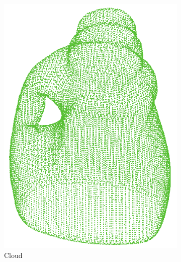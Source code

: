 \begin{figure}[!t]
\begin{subfigure}{0.3\linewidth}
    \includegraphics[width=\linewidth]{Figures/ObjRecog/cloud.png}
    \caption{Cloud}
    \label{fig:objrecog:meshcloudgrid:cloud}
  \end{subfigure}
  \begin{subfigure}{0.3\linewidth}
    \centering

\end{subfigure}
\end{figure}
